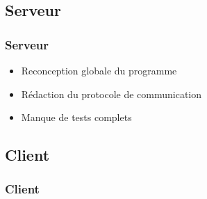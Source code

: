 \subsection{Serveur}
	\begin{frame}
		\frametitle{Serveur}
        \begin{itemize}
            \item Reconception globale du programme \newline
            \item Rédaction du protocole de communication \newline
            \item Manque de tests complets \newline
        \end{itemize}
	\end{frame}

\subsection{Client}
	\begin{frame}
		\frametitle{Client}
	\end{frame}
